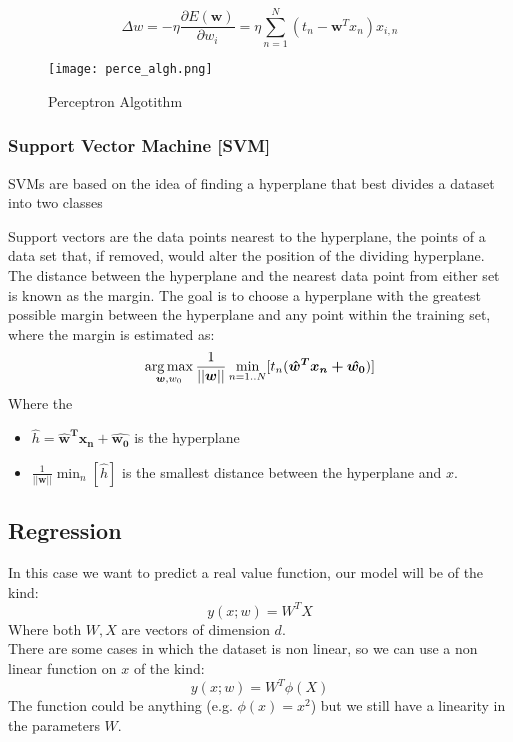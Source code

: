 \[\Delta w=-\eta \frac{\partial E(\bm{w}) }{\partial w_i}=\eta \sum_{n=1}^N(t_n-\bm{w}^Tx_n)x_{i,n} \]

\begin{figure}[H]
\texttt{[image: perce\_algh.png]}
\caption{Perceptron Algotithm}
\end{figure}

\subsubsection{Support Vector Machine [SVM]}
SVMs are based on the idea of finding a hyperplane that best divides a dataset into two classes


\begin{figure}[H]
    \centering
    \qquad

\label{fig:linear_problem}%
\end{figure}

Support vectors are the data points nearest to the hyperplane, the points of a data set that, if removed, would alter the position of the dividing hyperplane.\\
The distance between the hyperplane and the nearest data point from either set is known as the margin. The goal is to choose a hyperplane with the greatest possible margin between the hyperplane and any point within the training set, where the margin is estimated as:
\[\operatorname*{arg\,max}_{\bm{w},w_0}\frac{1}{||\bm{w}||}\min_{n=1..N}[t_n(\bm{\hat{w}^Tx_n+\hat{w_0}})]\]
Where the
\begin{itemize}
\item $\hat{h}=\bm{\hat{w}^Tx_n+\hat{w_0}}$ is the hyperplane
\item $\frac{1}{||\bm{w}||}\min_{n}[\hat{h}]$ is the smallest distance between the hyperplane and $x$.

\end{itemize}

\subsection{Regression}
In this case we want to predict a real value function, our model will be of the kind:
$$y(x;w)=W^TX$$
Where both $W,X$ are vectors of dimension $d$.\\
There are some cases in which the dataset is non linear, so we can use a non linear function on $x$ of the kind:
$$y(x;w)=W^T\phi (X)$$
The function could be anything (e.g. $\phi(x)=x^2$) but we still have a linearity in the parameters $W$.

